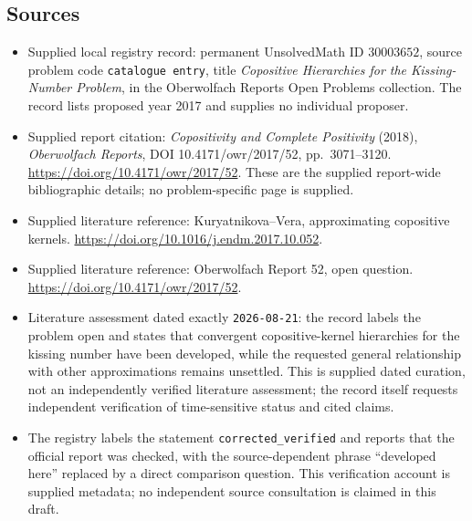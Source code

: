 \documentclass[11pt]{article}
\begin{document}
\subsection{Sources}
\begin{itemize}
\item Supplied local registry record: permanent UnsolvedMath ID \(30003652\), source problem code \texttt{catalogue entry}, title \emph{Copositive Hierarchies for the Kissing-Number Problem}, in the Oberwolfach Reports Open Problems collection. The record lists proposed year 2017 and supplies no individual proposer.
\item Supplied report citation: \emph{Copositivity and Complete Positivity} (2018), \emph{Oberwolfach Reports}, DOI 10.4171/owr/2017/52, pp.\ 3071--3120. \url{https://doi.org/10.4171/owr/2017/52}. These are the supplied report-wide bibliographic details; no problem-specific page is supplied.
\item Supplied literature reference: Kuryatnikova--Vera, approximating copositive kernels. \url{https://doi.org/10.1016/j.endm.2017.10.052}.
\item Supplied literature reference: Oberwolfach Report 52, open question. \url{https://doi.org/10.4171/owr/2017/52}.
\item Literature assessment dated exactly \texttt{2026-08-21}: the record labels the problem open and states that convergent copositive-kernel hierarchies for the kissing number have been developed, while the requested general relationship with other approximations remains unsettled. This is supplied dated curation, not an independently verified literature assessment; the record itself requests independent verification of time-sensitive status and cited claims.
\item The registry labels the statement \texttt{corrected\_verified} and reports that the official report was checked, with the source-dependent phrase ``developed here'' replaced by a direct comparison question. This verification account is supplied metadata; no independent source consultation is claimed in this draft.
\end{itemize}
\end{document}
